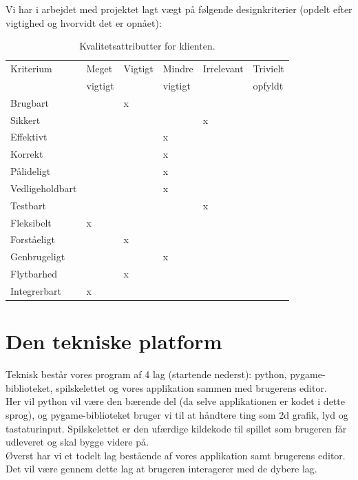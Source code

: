 \documentclass[10pt,a4paper,danish]{article}
\begin{document}
Vi har i arbejdet med projektet lagt vægt på følgende designkriterier (opdelt efter vigtighed og
hvorvidt det er opnået): 
\begin{table}[h!]
  \begin{center}
    \begin{tabular}{llllll}
      \toprule
      Kriterium & Meget   & Vigtigt & Mindre  & Irrelevant & Trivielt \\
                & vigtigt &         & vigtigt &            & opfyldt  \\
      \midrule
      Brugbart        & &x& & & \\
      Sikkert         & & & &x& \\
      Effektivt       & & &x& & \\
      Korrekt         & & &x& & \\
      Pålideligt      & & &x& & \\
      Vedligeholdbart & & &x& & \\
      Testbart        & & & &x& \\
      Fleksibelt      &x& & & & \\
      Forståeligt     & &x& & & \\
      Genbrugeligt    & & &x& & \\
      Flytbarhed      & &x& & & \\
      Integrerbart    &x& & & & \\
      \bottomrule
    \end{tabular}
    \caption{Kvalitetsattributter for klienten.}
    \label{tab:kvalitetsattributter_program}
  \end{center}
\end{table}

\section{Den tekniske platform}
Teknisk består vores program af 4 lag (startende nederst): python, pygame-biblioteket, 
spilskelettet og vores applikation sammen med brugerens editor. \\

Her vil python vil være den bærende del (da selve applikationen er kodet i dette sprog), 
og pygame-biblioteket bruger vi til at håndtere ting som 2d grafik, lyd og tastaturinput. 
Spilskelettet er den ufærdige kildekode til spillet som brugeren får udleveret og skal bygge
videre på.
\\
Øverst har vi et todelt lag bestående af vores applikation samt brugerens editor.
Det vil være gennem dette lag at brugeren interagerer med de dybere lag.
\end{document}

